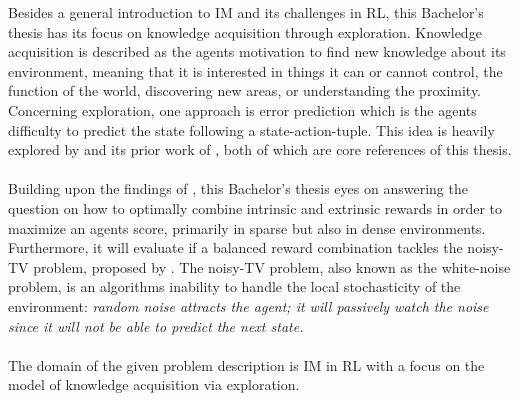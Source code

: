 \documentclass[draft,final]{vutinfth} %
\begin{document}
    Besides a general introduction to IM and its challenges in RL, this Bachelor's thesis has its focus on knowledge acquisition through exploration.
    Knowledge acquisition is described as the agents motivation to find new knowledge about its environment, meaning that it is interested in things it can or cannot control, the function of the world, discovering new areas, or understanding the proximity.
    Concerning exploration, one approach is error prediction which is the agents difficulty to predict the state following a state-action-tuple.
    This idea is heavily explored by \cite{burda_large-scale_2018} and its prior work of \cite{pathak_curiosity-driven_2017}, both of which are core references of this thesis.
    \\\\
    Building upon the findings of \cite{burda_large-scale_2018}, this Bachelor's thesis eyes on answering the question on how to optimally combine intrinsic and extrinsic rewards in order to maximize an agents score, primarily in sparse but also in dense environments.
    Furthermore, it will evaluate if a balanced reward combination tackles the noisy-TV problem, proposed by \cite{schmidhuber_formal_2010}.
    The noisy-TV problem, also known as the white-noise problem, is an algorithms inability to handle the local stochasticity of the environment: \textit{random noise attracts the agent; it will passively watch the noise since it will not be able to predict the next state.}
    \\\\
    The domain of the given problem description is IM in RL with a focus on the model of knowledge acquisition via exploration.
\end{document}
